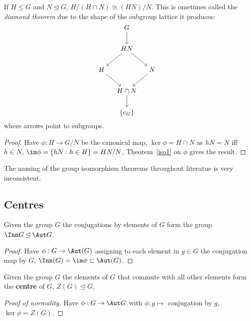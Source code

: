 \documentclass[../Year2.tex]{subfiles}
\begin{document}
\begin{theorem}\label{iso2}
    If $H\leq G$ and $N\unlhd G$, $H/(H\cap N)\cong (HN)/N$. This is ometimes called the \textit{diamond theorem} due to the shape of the subgroup lattice it produces: \[
        \begin{tikzcd}[cramped, column sep=small]
            & G \arrow[d]& \\
            & HN \arrow[ld] \arrow [rd]& \\
            H \arrow[rd] & & N \arrow[ld]\\
            & H\cap N \arrow[d]& \\
            & \{e_G\}& 
        \end{tikzcd}
    \] where arrows point to subgroups.
    \begin{proof}
        Have $\phi:H\rightarrow G/N$ be the canonical map, $\ker\phi = H\cap N$ as $hN=N$ iff $h\in N$, $\im \phi = \{hN:h\in H\}=HN/N$, Theorem~\ref{iso1} on $\phi$ gives the result.
    \end{proof}
\end{theorem}

\begin{note}
    The naming of the group isomorphism theorems throughout literatue is very inconsistent.
\end{note}

\subsection{Centres}

\begin{definition}
    Given the group $G$ the conjugations by elements of $G$ form the group $\Inn G\unlhd\Aut G$.
    \begin{proof}
        Have $\phi:G\rightarrow \Aut(G)$ assigning to each element in $g\in G$ the conjugation map by $G$, $\Inn(G) = \im \phi \subset \Aut(G)$. 
    \end{proof}
\end{definition}

\begin{definition}
    Given the group $G$ the elements of $G$ that commute with all other elements form the \textbf{centre} of $G$, $Z(G)\unlhd G$.
    \begin{proof}[Proof of normality]
        Have $\phi:G\rightarrow\Aut G$ with $\phi:g\mapsto$ conjugation by $g$, $\ker \phi = Z(G)$.
    \end{proof}
\end{definition}
\end{document}
